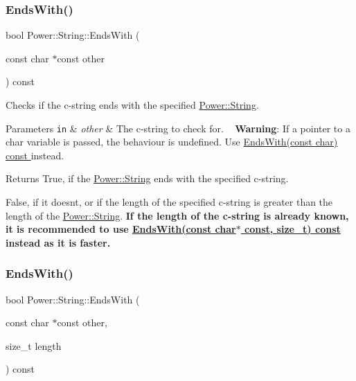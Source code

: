 \subsubsection{\texorpdfstring{Ends\+With()}{EndsWith()}\hspace{0.1cm}{\footnotesize\ttfamily [2/4]}}
{\footnotesize\ttfamily bool Power\+::\+String\+::\+Ends\+With (\begin{DoxyParamCaption}\item[{const char $\ast$const}]{other }\end{DoxyParamCaption}) const\hspace{0.3cm}{\ttfamily [inline]}}



Checks if the c-\/string ends with the specified \hyperlink{class_power_1_1_string}{Power\+::\+String}. 


\begin{DoxyParams}[1]{Parameters}
\mbox{\tt in}  & {\em other} & The c-\/string to check for. ~\newline
 {\bfseries Warning}\+: If a pointer to a char variable is passed, the behaviour is undefined. Use \hyperlink{class_power_1_1_string_a8f4b32bad7099116f14259d2bd0c4004}{Ends\+With(const char) const }instead. \\
\hline
\end{DoxyParams}
\begin{DoxyReturn}{Returns}
True, if the \hyperlink{class_power_1_1_string}{Power\+::\+String} ends with the specified c-\/string. 

False, if it doesn\textquotesingle{}t, or if the length of the specified c-\/string is greater than the length of the \hyperlink{class_power_1_1_string}{Power\+::\+String}.  {\bfseries If the length of the c-\/string is already known, it is recommended to use \hyperlink{class_power_1_1_string_a7e5527a7258c8e83f19cc5a353a203b9}{Ends\+With(const char$\ast$ const, size\+\_\+t) const }instead as it is faster.} 
\end{DoxyReturn}
\mbox{\label{class_power_1_1_string_a7e5527a7258c8e83f19cc5a353a203b9}} 
\subsubsection{\texorpdfstring{Ends\+With()}{EndsWith()}\hspace{0.1cm}{\footnotesize\ttfamily [3/4]}}
{\footnotesize\ttfamily bool Power\+::\+String\+::\+Ends\+With (\begin{DoxyParamCaption}\item[{const char $\ast$const}]{other,  }\item[{size\+\_\+t}]{length }\end{DoxyParamCaption}) const\hspace{0.3cm}{\ttfamily [inline]}}



